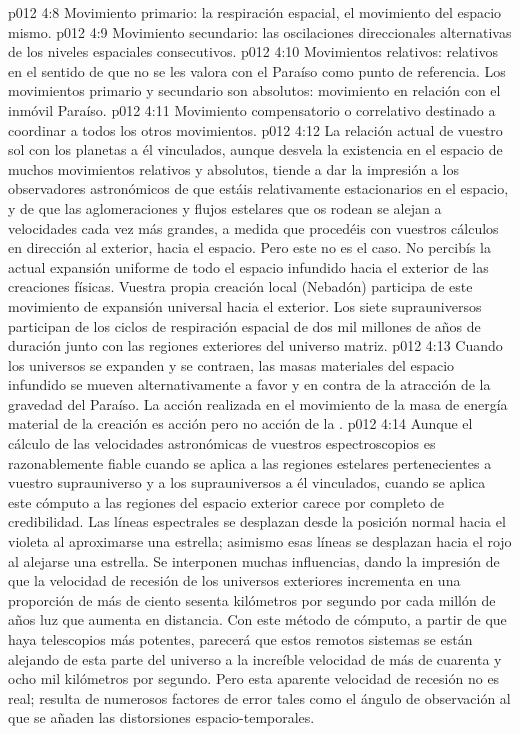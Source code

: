 \vs p012 4:8 Movimiento primario: la respiración espacial, el movimiento del espacio mismo.
\vs p012 4:9 Movimiento secundario: las oscilaciones direccionales alternativas de los niveles espaciales consecutivos.
\vs p012 4:10 Movimientos relativos: relativos en el sentido de que no se les valora con el Paraíso como punto de referencia. Los movimientos primario y secundario son absolutos: movimiento en relación con el inmóvil Paraíso.
\vs p012 4:11 Movimiento compensatorio o correlativo destinado a coordinar a todos los otros movimientos.
\vs p012 4:12 \pc La relación actual de vuestro sol con los planetas a él vinculados, aunque desvela la existencia en el espacio de muchos movimientos relativos y absolutos, tiende a dar la impresión a los observadores astronómicos de que estáis relativamente estacionarios en el espacio, y de que las aglomeraciones y flujos estelares que os rodean se alejan a velocidades cada vez más grandes, a medida que procedéis con vuestros cálculos en dirección al exterior, hacia el espacio. Pero este no es el caso. No percibís la actual expansión uniforme de todo el espacio infundido hacia el exterior de las creaciones físicas. Vuestra propia creación local (Nebadón) participa de este movimiento de expansión universal hacia el exterior. Los siete suprauniversos participan de los ciclos de respiración espacial de dos mil millones de años de duración junto con las regiones exteriores del universo matriz.
\vs p012 4:13 Cuando los universos se expanden y se contraen, las masas materiales del espacio infundido se mueven alternativamente a favor y en contra de la atracción de la gravedad del Paraíso. La acción realizada en el movimiento de la masa de energía material de la creación es acción  pero no acción de la .
\vs p012 4:14 \pc Aunque el cálculo de las velocidades astronómicas de vuestros espectroscopios es razonablemente fiable cuando se aplica a las regiones estelares pertenecientes a vuestro suprauniverso y a los suprauniversos a él vinculados, cuando se aplica este cómputo a las regiones del espacio exterior carece por completo de credibilidad. Las líneas espectrales se desplazan desde la posición normal hacia el violeta al aproximarse una estrella; asimismo esas líneas se desplazan hacia el rojo al alejarse una estrella. Se interponen muchas influencias, dando la impresión de que la velocidad de recesión de los universos exteriores incrementa en una proporción de más de ciento sesenta kilómetros por segundo por cada millón de años luz que aumenta en distancia. Con este método de cómputo, a partir de que haya telescopios más potentes, parecerá que estos remotos sistemas se están alejando de esta parte del universo a la increíble velocidad de más de cuarenta y ocho mil kilómetros por segundo. Pero esta aparente velocidad de recesión no es real; resulta de numerosos factores de error tales como el ángulo de observación al que se añaden las distorsiones espacio\hyp{}temporales.
